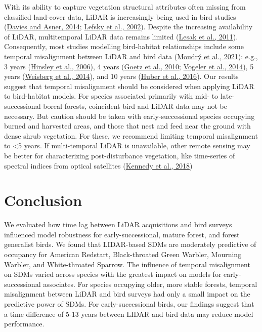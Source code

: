 \documentclass[
  12pt,
]{article}
\begin{document}
With its ability to capture vegetation structural attributes often missing from classified land-cover data, LiDAR is increasingly being used in bird studies (\protect\hyperlink{ref-Davies2014a}{Davies and Asner, 2014}; \protect\hyperlink{ref-Lefsky2002}{Lefsky et al., 2002}). Despite the increasing availability of LiDAR, multitemporal LiDAR data remains limited (\protect\hyperlink{ref-Lesak2011a}{Lesak et al., 2011}). Consequently, most studies modelling bird-habitat relationships include some temporal misalignment between LiDAR and bird data (\protect\hyperlink{ref-moudryRoleVegetationStructure2021}{Moudrý et al., 2021}): e.g., 3 years (\protect\hyperlink{ref-hinsleyApplicationLidarWoodland2006}{Hinsley et al., 2006}), 4 years (\protect\hyperlink{ref-Goetz2010}{Goetz et al., 2010}; \protect\hyperlink{ref-vogelerTerrainVegetationStructural2014a}{Vogeler et al., 2014}), 5 years (\protect\hyperlink{ref-Weisberg2014}{Weisberg et al., 2014}), and 10 years (\protect\hyperlink{ref-huberUsingRemotesensingData2016}{Huber et al., 2016}). Our results suggest that temporal misalignment should be considered when applying LiDAR to bird-habitat models. For species associated primarily with mid- to late-successional boreal forests, coincident bird and LiDAR data may not be necessary. But caution should be taken with early-successional species occupying burned and harvested areas, and those that nest and feed near the ground with dense shrub vegetation. For these, we recommend limiting temporal misalignment to \textless5 years. If multi-temporal LiDAR is unavailable, other remote sensing may be better for characterizing post-disturbance vegetation, like time-series of spectral indices from optical satellites (\protect\hyperlink{ref-Kennedy2018}{Kennedy et al., 2018})

\hypertarget{conclusion}{%
\section{Conclusion}\label{conclusion}}

We evaluated how time lag between LiDAR acquisitions and bird surveys influenced model robustness for early-successional, mature forest, and forest generalist birds. We found that LIDAR-based SDMs are moderately predictive of occupancy for American Redstart, Black-throated Green Warbler, Mourning Warbler, and White-throated Sparrow. The influence of temporal misalignment on SDMs varied across species with the greatest impact on models for early-successional associates. For species occupying older, more stable forests, temporal misalignment between LiDAR and bird surveys had only a small impact on the predictive power of SDMs. For early-successional birds, our findings suggest that a time difference of 5-13 years between LIDAR and bird data may reduce model performance.
\end{document}
